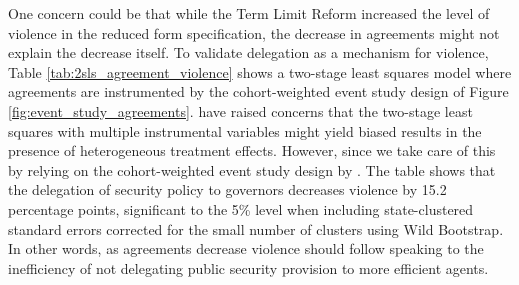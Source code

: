 \documentclass[12pt]{amsart}
\numberwithin{equation}{section}
\theoremstyle{definition}
\theoremstyle{definition}
\theoremstyle{definition}
\begin{document}
One concern could be that while the Term Limit Reform increased the level of violence in the reduced form specification, the decrease in agreements might not explain the decrease itself. To validate delegation as a mechanism for violence, Table \ref{tab:2sls_agreement_violence} shows a two-stage least squares model where agreements are instrumented by the cohort-weighted event study design of Figure \ref{fig:event_study_agreements}. \citet{mostad_etal_2020} have raised concerns that the two-stage least squares with multiple instrumental variables might yield biased results in the presence of heterogeneous treatment effects. However, since we take care of this by relying on the cohort-weighted event study design by \citet{abraham_sun_2020}. The table shows that the delegation of security policy to governors decreases violence by 15.2 percentage points, significant to the 5\% level when including state-clustered standard errors corrected for the small number of clusters using Wild Bootstrap. In other words, as agreements decrease violence should follow speaking to the inefficiency of not delegating public security provision to more efficient agents. 
   
\end{document}
